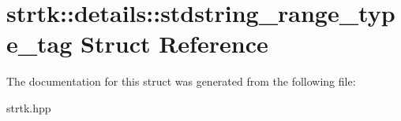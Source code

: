 \hypertarget{structstrtk_1_1details_1_1stdstring__range__type__tag}{\section{strtk\-:\-:details\-:\-:stdstring\-\_\-range\-\_\-type\-\_\-tag Struct Reference}
\label{structstrtk_1_1details_1_1stdstring__range__type__tag}
}


The documentation for this struct was generated from the following file\-:\begin{DoxyCompactItemize}
\item 
strtk.\-hpp\end{DoxyCompactItemize}
